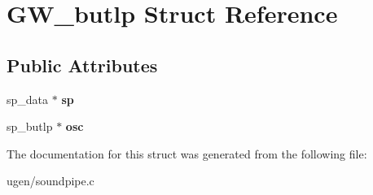 \hypertarget{structGW__butlp}{}\section{G\+W\+\_\+butlp Struct Reference}
\label{structGW__butlp}
\subsection*{Public Attributes}
\begin{DoxyCompactItemize}
\item 
\hypertarget{structGW__butlp_aee5be970a010be1b5549926a3b0d6d81}{}\label{structGW__butlp_aee5be970a010be1b5549926a3b0d6d81} 
sp\+\_\+data $\ast$ {\bfseries sp}
\item 
\hypertarget{structGW__butlp_a2ce9b96465630fd7e4019ccfcb152e33}{}\label{structGW__butlp_a2ce9b96465630fd7e4019ccfcb152e33} 
sp\+\_\+butlp $\ast$ {\bfseries osc}
\end{DoxyCompactItemize}


The documentation for this struct was generated from the following file\+:\begin{DoxyCompactItemize}
\item 
ugen/soundpipe.\+c\end{DoxyCompactItemize}
